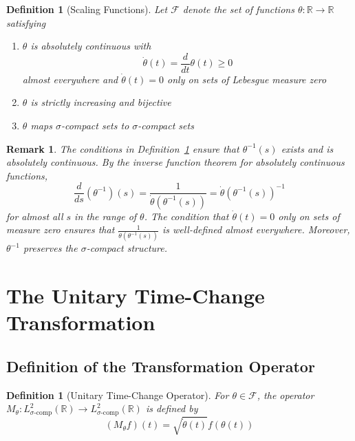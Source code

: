 \documentclass{article}
\newtheorem{definition}[theorem]{Definition}
\newtheorem{remark}[theorem]{Remark}
\begin{document}
\begin{definition}[Scaling Functions]\label{def:scaling}
Let $\mathcal{F}$ denote the set of functions $\theta : \mathbb{R} \to \mathbb{R}$ satisfying
\begin{enumerate}
\item $\theta$ is absolutely continuous with
\begin{equation}
\dot{\theta}(t) = \frac{d}{dt} \theta(t) \geq 0
\end{equation}
almost everywhere and $\dot{\theta}(t) = 0$ only on sets of Lebesgue measure zero
\item $\theta$ is strictly increasing and bijective
\item $\theta$ maps $\sigma$-compact sets to $\sigma$-compact sets
\end{enumerate}
\end{definition}

\begin{remark}\label{rem:inverse_properties}
The conditions in Definition~\ref{def:scaling} ensure that $\theta^{-1}(s)$ exists and is absolutely continuous. By the inverse function theorem for absolutely continuous functions,
\begin{equation}
\frac{d}{ds}(\theta^{-1})(s) = \frac{1}{\dot{\theta}(\theta^{-1}(s))} = \dot{\theta}(\theta^{-1}(s))^{-1}
\end{equation}
for almost all $s$ in the range of $\theta$. The condition that $\dot{\theta}(t) = 0$ only on sets of measure zero ensures that $\frac{1}{\dot{\theta}(\theta^{-1}(s))}$ is well-defined almost everywhere. Moreover, $\theta^{-1}$ preserves the $\sigma$-compact structure.
\end{remark}

\section{The Unitary Time-Change Transformation}

\subsection{Definition of the Transformation Operator}

\begin{definition}[Unitary Time-Change Operator]\label{def:unitary_op}
For $\theta \in \mathcal{F}$, the operator $M_{\theta} : L^2_{\sigma\text{-comp}}(\mathbb{R}) \to L^2_{\sigma\text{-comp}}(\mathbb{R})$ is defined by
\begin{equation}
\label{eq:unitary_op}
(M_{\theta} f)(t) = \sqrt{\dot{\theta}(t)} f(\theta(t))
\end{equation}
\end{definition}
\end{document}
